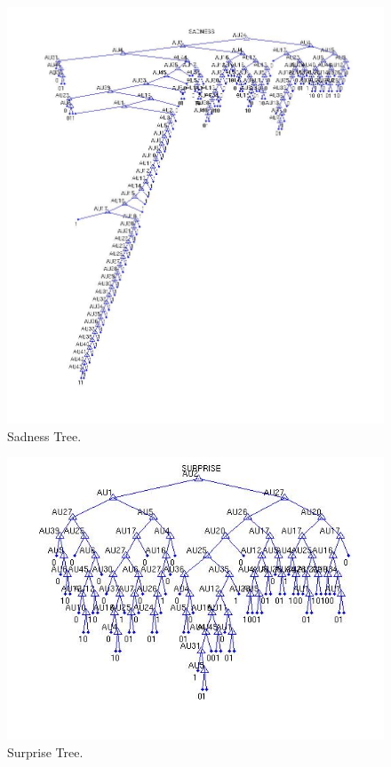\documentclass[a4paper,12pt,oneside,final]{report}
\newenvironment{changemargin}[2]{\begin{list}{}{%
\setlength{\topsep}{0pt}%
\setlength{\leftmargin}{0pt}%
\setlength{\rightmargin}{0pt}%
\setlength{\listparindent}{\parindent}%
\setlength{\itemindent}{\parindent}%
\setlength{\parsep}{0pt plus 1pt}%
\addtolength{\leftmargin}{#1}%
\addtolength{\rightmargin}{#2}%
}\item }{\end{list}}
\begin{document}
\begin{figure}[!h]
\center
\includegraphics[scale=0.6]{sadness.jpg}
\caption{Sadness Tree.}
\end{figure}

\begin{figure}[!h]
\begin{changemargin}{-20mm}{-20mm}
\center
\includegraphics[scale=1]{surprise.jpg}
\caption{Surprise Tree.}
\end{changemargin}
\end{figure}
\FloatBarrier
\end{document}
